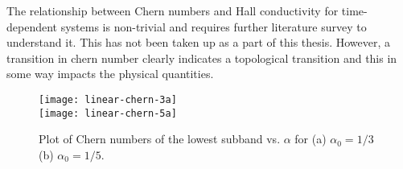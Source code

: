 The relationship between Chern numbers and Hall conductivity for time-dependent systems is non-trivial and requires further literature survey to understand it. This has not been 
taken up as a part of this thesis. However, a transition in chern number clearly indicates a topological transition and this in some way impacts the physical quantities.
\begin{figure}[h]
 \centering
 \texttt{[image: linear-chern-3a]}\\
 \texttt{[image: linear-chern-5a]}
 \caption{Plot of Chern numbers of the lowest subband vs. $\alpha$ for (a) $\alpha_0 = 1/3$ (b) $\alpha_0 = 1/5$.}
\end{figure}

